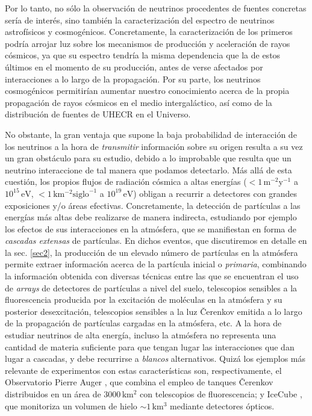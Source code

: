 \documentclass[11 pt, a4paper]{article} %
\numberwithin{equation}{section}
\numberwithin{figure}{section}
\numberwithin{table}{section}
\begin{document}
	Por lo tanto, no sólo la observación de neutrinos procedentes de fuentes concretas sería de interés, sino también la caracterización del espectro de neutrinos astrofísicos y cosmogénicos. Concretamente, la caracterización de los primeros podría arrojar luz sobre los mecanismos de producción y aceleración de rayos cósmicos, ya que su espectro tendría la misma dependencia que la de estos últimos en el momento de su producción, antes de verse afectados por interacciones a lo largo de la propagación. Por su parte, los neutrinos cosmogénicos permitirían aumentar nuestro conocimiento acerca de la propia propagación de rayos cósmicos en el medio intergaláctico, así como de la distribución de fuentes de UHECR en el Universo.
	
	No obstante, la gran ventaja que supone la baja probabilidad de interacción de los neutrinos a la hora de \textit{transmitir} información sobre su origen resulta a su vez un gran obstáculo para su estudio, debido a lo improbable que resulta que un neutrino interaccione de tal manera que podamos detectarlo. Más allá de esta cuestión, los propios flujos de radiación cósmica a altas energías ($<1\,\mathrm{m^{-2}y^{-1}}$ a $10^{15}\,\mathrm{eV}$, $<1\,\mathrm{km^{-2}\text{siglo}^{-1}}$ a $10^{19}\,\mathrm{eV}$) obligan a recurrir a detectores con grandes exposiciones y/o áreas efectivas. Concretamente, la detección de partículas a las energías más altas debe realizarse de manera indirecta, estudiando por ejemplo los efectos de sus interacciones en la atmósfera, que se manifiestan en forma de \textit{cascadas extensas} de partículas. En dichos eventos, que discutiremos en detalle en la sec. \ref{sec2}, la producción de un elevado número de partículas en la atmósfera permite extraer información acerca de la partícula inicial o \textit{primaria}, combinando la información obtenida con diversas técnicas entre las que se encuentran el uso de \textit{arrays} de detectores de partículas a nivel del suelo, telescopios sensibles a la fluorescencia producida por la excitación de moléculas en la atmósfera y su posterior desexcitación, telescopios sensibles a la luz \v{C}erenkov emitida a lo largo de la propagación de partículas cargadas en la atmósfera, etc. A la hora de estudiar neutrinos de alta energía, incluso la atmósfera no representa una cantidad de materia suficiente para que tengan lugar las interacciones que dan lugar a cascadas, y debe recurrirse a \textit{blancos} alternativos. Quizá los ejemplos más relevante de experimentos con estas características son, respectivamente, el Observatorio Pierre Auger \cite{pierre2015pierre}, que combina el empleo de tanques \v{C}erenkov distribuidos en un área de $3000\,\mathrm{km^2}$ con telescopios de fluorescencia; y IceCube \cite{halzen2010invited}, que monitoriza un volumen de hielo $\sim 1\,\mathrm{km^3}$ mediante detectores ópticos.
\end{document}
